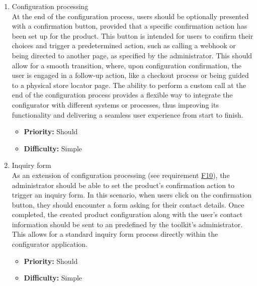 \begin{enumerate}[label=\textbf{F\arabic*:}, leftmargin=30pt]
\item \label{itm:F10} Configuration processing
\vspace{2pt}
\\At the end of the configuration process, users should be optionally presented with a confirmation button, provided that a specific confirmation action has been set up for the product. This button is intended for users to confirm their choices and trigger a predetermined action, such as calling a webhook or being directed to another page, as specified by the administrator. This should allow for a smooth transition, where, upon configuration confirmation, the user is engaged in a follow-up action, like a checkout process or being guided to a physical store locator page. The ability to perform a custom  call at the end of the configuration process provides a flexible way to integrate the configurator with different systems or processes, thus improving its functionality and delivering a seamless user experience from start to finish.
\begin{itemize}[noitemsep, label=\trianglebullet]
    \item \textbf{Priority:} Should
    \item \textbf{Difficulty:} Simple
\end{itemize}
\vspace{4pt}

\item \label{itm:F11} Inquiry form
\vspace{2pt}
\\As an extension of configuration processing (see requirement \hyperref[itm:F10]{F10}), the administrator should be able to set the product's confirmation action to trigger an inquiry form. In this scenario, when users click on the confirmation button, they should encounter a form asking for their contact details. Once completed, the created product configuration along with the user's contact information should be sent to an  predefined by the toolkit's administrator. This allows for a standard inquiry form process directly within the configurator application.
\begin{itemize}[noitemsep, label=\trianglebullet]
    \item \textbf{Priority:} Should
    \item \textbf{Difficulty:} Simple
\end{itemize}
\vspace{4pt}


\end{enumerate}
